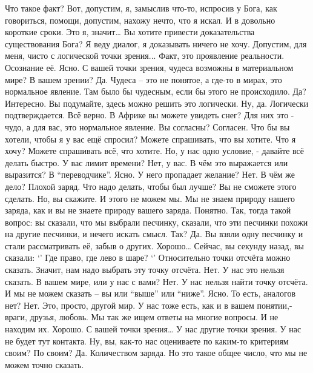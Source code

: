 \documentclass{extbook}
\newcommand{\soul}[1]{{#1}}
\newcommand{\people}[1]{{#1}}
\begin{document}
\people{Что такое факт? Вот,  допустим, я, замыслив  что-то, испросив у Бога, как говориться,  помощи, допустим, нахожу нечто, что я искал. И в довольно короткие сроки. Это я, значит…}
\soul{Вы хотите привести доказательства существования Бога?}
\people{Я веду диалог, я доказывать ничего не хочу. Допустим,  для меня, чисто с логической точки зрения...}
\soul{Факт, это проявление реальности. Осознание её.}
\people{Ясно. С вашей точки зрения, чудеса возможны в материальном мире?}
\soul{В вашем зрении?}
\people{Да.}
\soul{Чудеса – это не понятое, а где-то в мирах, это нормальное явление. Там было бы чудесным, если бы этого не происходило.}
\people{Да? Интересно.}
\soul{Вы подумайте, здесь можно решить это логически. }
\people{Ну, да. Логически подтверждается. Всё верно.}
\soul{В Африке вы можете увидеть снег?    Для них это - чудо, а для вас, это нормальное явление. Вы согласны?}
\people{Согласен. Что бы вы хотели, чтобы я у вас ещё спросил?}
\soul{Можете спрашивать, что вы хотите.}
\people{Что я хочу?}
\soul{Можете спрашивать всё, что хотите. Но, у нас одно условие, -  давайте всё делать быстро.}
\people{У вас лимит времени?}
\soul{Нет, у вас.}
\people{В чём это выражается или выразится?}
\soul{В ``переводчике''.}
\people{Ясно. У него пропадает желание?}
\soul{Нет.}
\people{В чём же дело?}
\soul{Плохой заряд.}
\people{Что надо делать, чтобы был лучше?}
\soul{Вы не сможете этого сделать.}
\people{Но, вы скажите. }
\soul{И этого не можем мы. Мы не знаем природу нашего заряда, как и вы не знаете природу вашего заряда.}
\people{Понятно. Так, тогда  такой вопрос: вы сказали, что мы выбрали песчинку, сказали, что эти песчинки похожи на другие песчинки, и нечего искать смысл. Так?}
\soul{Да. Вы взяли одну песчинку  и стали рассматривать её, забыв о других. }
\people{Хорошо… Сейчас, вы секунду назад, вы сказали: ‘’ Где право, где лево в шаре? ‘’ }
\soul{Относительно точки отсчёта можно сказать.}
\people{Значит, нам надо выбрать эту точку отсчёта.}
\soul{Нет. У нас это нельзя сказать.}
\people{В вашем мире, или у нас с вами?}
\soul{Нет. У нас нельзя найти точку отсчёта. И мы не можем сказать – вы или ``выше'' или ``ниже''.}
\people{Ясно. То есть, аналогов нет?}
\soul{Нет. Это, просто, другой мир. У нас тоже есть, как и в вашем понятии,- враги, друзья, любовь. Мы так же ищем ответы на многие вопросы. И не находим их.}
\people{Хорошо. С вашей точки зрения…}
\soul{У нас другие точки зрения. У нас не будет  тут  контакта.}
\people{Ну, вы, как-то нас оцениваете по каким-то критериям своим?}
\soul{По своим?}
\people{Да.}
\soul{Количеством заряда. Но это такое общее число, что мы не можем точно сказать.}
\end{document}
